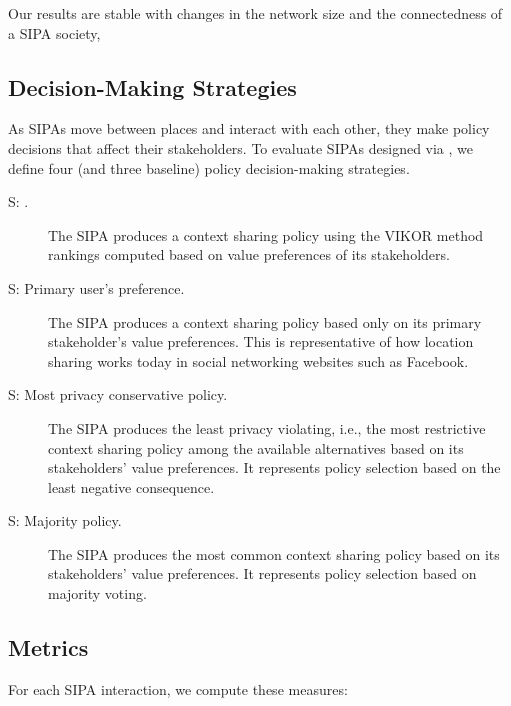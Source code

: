 Our results are stable with changes in the network size and the connectedness of a SIPA society, 

\subsection{Decision-Making Strategies}
\label{sec:decision-making-strategies}

As \locationapp SIPAs move between places and interact with each other, they make policy decisions that affect their stakeholders. To evaluate SIPAs designed via \frameworkAinur, we define four (\frameworkAinur and three baseline) policy decision-making strategies. 

\begin{description}
\item[S\fsub{\frameworkAinur}: \frameworkAinur.] The SIPA produces a context sharing policy using the VIKOR method rankings computed based on value preferences of its stakeholders.
\item[S: Primary user's preference.] The SIPA produces a context sharing policy based only on its primary stakeholder's value preferences. This is representative of how location sharing works today in social networking websites such as Facebook. 
\item[S: Most privacy conservative policy.] The SIPA produces the least privacy violating, i.e., the most restrictive context sharing policy among the available alternatives based on its stakeholders' value preferences. It represents policy selection based on the least negative consequence. 
\item[S: Majority policy.] The SIPA produces the most common context sharing policy based on its stakeholders' value preferences. It represents policy selection based on majority voting. 
\end{description}

\subsection{Metrics}

For each SIPA interaction, we compute these measures:

